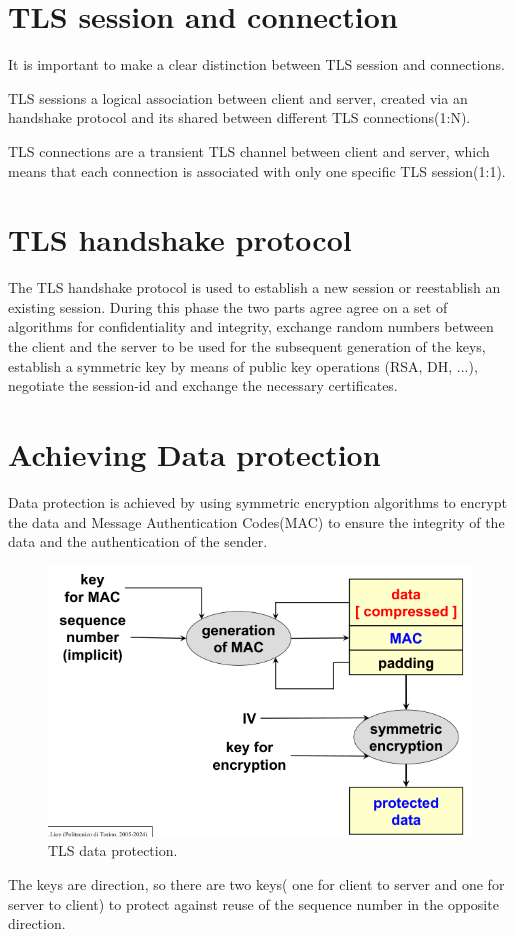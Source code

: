 \documentclass{report}
\begin{document}
\section{TLS session and connection}
It is important to make a clear distinction between TLS session and
connections.

TLS sessions a logical association between client and server, created
via an handshake protocol and its shared between different TLS
connections(1:N).

TLS connections are a transient TLS channel between client and server,
which means that each connection is associated with only one specific
TLS session(1:1).
\section{TLS handshake protocol}
The TLS handshake protocol is used to establish a new session or
reestablish an existing session. During this phase the two parts agree
agree on a set of algorithms for confidentiality and integrity,
exchange random numbers between the client and the server to be used
for the subsequent generation of the keys, establish a symmetric key
by means of public key operations (RSA, DH, ...), negotiate the
session-id and exchange the necessary certificates.

\section{Achieving Data protection}
Data protection is achieved by using symmetric encryption algorithms
to encrypt the data and Message Authentication Codes(MAC) to ensure
the integrity of the data and the authentication of the sender.

\begin{figure}[H]
  \centering
  \includegraphics[width=.5\textwidth]{img/TLS data protection.png}
  \caption{TLS data protection.}
  \label{fig:tls-data-protection}
\end{figure}

The keys are direction, so there are two keys( one for client to
server and one for server to client) to protect against reuse of the
sequence number in the opposite direction.
\end{document}
